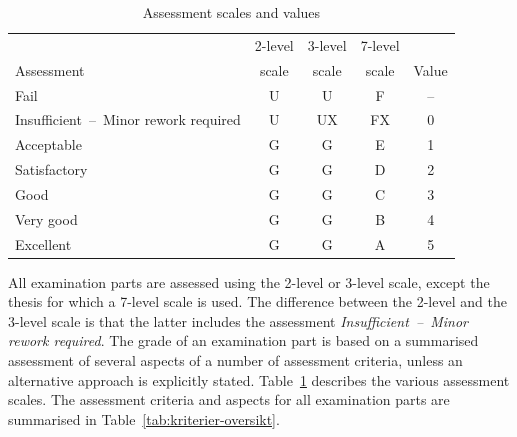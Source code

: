 \documentclass[a4paper,12pt]{book}
\begin{document}
\begin{table}
\small
\centering
\caption{Assessment scales and values}
\label{tab:bedomningsskalor}
\begin{tabular}{|l|c|c|c|c|}
\hline
                            & 2-level   & 3-level   & 7-level   &           \\
Assessment                  & scale     & scale     & scale     & Value     \\\hline
Fail                        & U         & U         & F         & --        \\\hline
Insufficient~--~Minor rework required   & U & UX  & FX        & $0$       \\\hline
Acceptable                  & G         & G         & E         & 1         \\\hline
Satisfactory                & G         & G         & D         & 2         \\\hline
Good                        & G         & G         & C         & 3         \\\hline
Very good                   & G         & G         & B         & 4         \\\hline
Excellent                   & G         & G         & A         & 5          \\\hline
\end{tabular}
\end{table}

All examination parts are assessed using the 2-level or 3-level scale, except
the thesis for which a 7-level scale is used. The difference between the
2-level and the 3-level scale is that the latter includes the assessment
\emph{Insufficient~--~Minor rework required}. The grade of an examination part
is based on a summarised assessment of several aspects of a number of
assessment criteria, unless an alternative approach is explicitly stated.
Table~\ref{tab:bedomningsskalor} describes the various assessment scales.
The assessment criteria and aspects for all examination parts are summarised in
Table~\ref{tab:kriterier-oversikt}.
\end{document}
